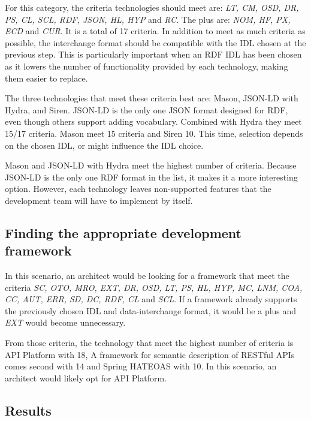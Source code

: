 For this category, the criteria technologies should meet are: \textit{LT, CM, OSD, DR, PS, CL, SCL, RDF, JSON, HL, HYP} and \textit{RC}. The plus are: \textit{NOM, HF, PX, ECD} and \textit{CUR}. It is a total of 17 criteria. In addition to meet as much criteria as possible, the interchange format should be compatible with the IDL chosen at the previous step. This is particularly important when an RDF IDL has been chosen as it lowers the number of functionality provided by each technology, making them easier to replace.

The three technologies that meet these criteria best are: Mason, JSON-LD with Hydra, and Siren. JSON-LD is the only one JSON  format designed for RDF, even though others support adding vocabulary. Combined with Hydra they meet 15/17 criteria. Mason meet 15 criteria and Siren 10. This time, selection depends on the chosen IDL, or might influence the IDL choice.

Mason and JSON-LD with Hydra meet the highest number of criteria. Because JSON-LD is the only one RDF format in the list, it makes it a more interesting option. However, each technology leaves non-supported features that the development team will have to implement by itself.

\subsection{Finding the appropriate development framework}

In this scenario, an architect would be looking for a framework that meet the criteria \textit{SC, OTO, MRO, EXT, DR, OSD, LT, PS, HL, HYP, MC, LNM, COA, CC, AUT, ERR, SD, DC, RDF, CL} and \textit{SCL}. If a framework already supports the previously chosen IDL and data-interchange format, it would be a plus and \textit{EXT} would become unnecessary.

From those criteria, the technology that meet the highest number of criteria is API Platform with 18, A framework for semantic description of RESTful APIs comes second with 14 and Spring HATEOAS with 10. In this scenario, an architect would likely opt for API Platform.

\subsection{Results}



